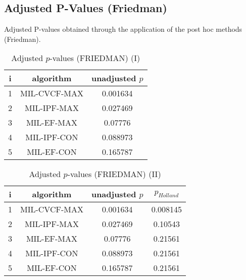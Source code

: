 \documentclass[a4paper,10pt]{article}
\begin{document}
\begin{landscape}
\newpage

\section{Adjusted P-Values (Friedman)}


Adjusted P-values obtained through the application of the post hoc methods (Friedman).

\begin{table}[!htp]
\centering\small
\begin{tabular}{ccc}
i&algorithm&unadjusted $p$\\
\hline1&MIL-CVCF-MAX&0.001634\\2&MIL-IPF-MAX&0.027469\\3&MIL-EF-MAX&0.07776\\4&MIL-IPF-CON&0.088973\\5&MIL-EF-CON&0.165787\\\hline
\end{tabular}
\caption{Adjusted $p$-values (FRIEDMAN) (I)}
\end{table}
\begin{table}[!htp]
\centering\small
\begin{tabular}{cccc}
i&algorithm&unadjusted $p$&$p_{Holland}$\\
\hline1&MIL-CVCF-MAX&0.001634&0.008145\\2&MIL-IPF-MAX&0.027469&0.10543\\3&MIL-EF-MAX&0.07776&0.21561\\4&MIL-IPF-CON&0.088973&0.21561\\5&MIL-EF-CON&0.165787&0.21561\\\hline
\end{tabular}
\caption{Adjusted $p$-values (FRIEDMAN) (II)}
\end{table}

\newpage
\end{landscape}
\end{document}
